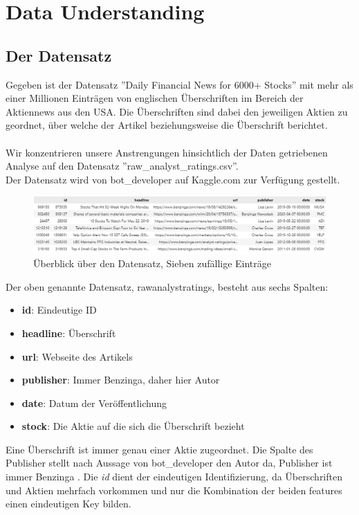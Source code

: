 \chapter{Data Understanding}
\section*{Der Datensatz}
Gegeben ist der Datensatz ''Daily Financial News for 6000+ Stocks'' mit mehr als einer Millionen Einträgen von englischen Überschriften im Bereich der Aktiennews aus den USA. Die Überschriften sind dabei den jeweiligen Aktien zu geordnet, über welche der Artikel beziehungsweise die Überschrift berichtet.\\ \\
Wir konzentrieren unsere Anstrengungen hinsichtlich der Daten getriebenen Analyse auf den Datensatz ''raw\_analyst\_ratings.csv''.\\
Der Datensatz wird von bot\_developer auf Kaggle.com zur Verfügung gestellt. \\
\citep[siehe][]{dailyfinancialnews}
\begin{figure}
    \includegraphics[scale=.49]{img/dataSample7.png}
    \caption{Überblick über den Datensatz, Sieben zufällige Einträge}
\end{figure}
Der oben genannte Datensatz, rawanalystratings, besteht aus sechs Spalten:
\begin{itemize}
    \item \textbf{id}: Eindeutige ID
    \item \textbf{headline}: Überschrift
    \item \textbf{url}: Webseite des Artikels
    \item \textbf{publisher}: Immer Benzinga, daher hier Autor
    \item \textbf{date}: Datum der Veröffentlichung
    \item \textbf{stock}: Die Aktie auf die sich die Überschrift bezieht
\end{itemize}
Eine Überschrift ist immer genau einer Aktie zugeordnet. Die Spalte des Publisher stellt nach Aussage von bot\_developer den Autor da, Publisher ist immer Benzinga \citep[übersetzt][]{dailyfinancialnews}.
Die \textit{id} dient der eindeutigen Identifizierung, da Überschriften und Aktien mehrfach vorkommen und nur die Kombination der beiden features einen eindeutigen Key bilden.
